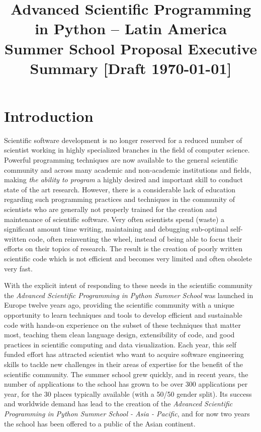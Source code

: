\documentclass{article}[11pt]
\title{%
\Large Advanced Scientific Programming in Python  -- Latin America
\\ \vspace{0.2cm}
\large Summer School Proposal  Executive Summary  [Draft \today]}
\date{}
\author{}
\begin{document}
\maketitle


\vspace*{-1.2cm}
\section*{Introduction}
Scientific software development is no longer reserved for a reduced number of
scientist working in highly specialized branches in the field of computer
science. Powerful programming techniques are now available to the general
scientific community and across many academic and non-academic institutions and
fields, making \emph{the ability to program} a highly desired and important
skill to conduct state of the art research. However, there is a considerable
lack of education regarding such programming practices and techniques in
the community of scientists who are generally not properly trained for the
creation and maintenance of scientific software. Very often scientists spend
(waste) a significant amount time writing, maintaining and debugging
sub-optimal self-written code, often reinventing the wheel, instead of being
able to focus their efforts on their topics of research. The result is the
creation of poorly written scientific code which is not efficient and becomes
very limited and often obsolete very fast.

With the explicit intent of responding to these needs in the scientific
community the \emph{Advanced Scientific Programming in Python Summer School}
was launched in Europe twelve years ago, providing the scientific community
with a unique opportunity to learn techniques and tools to develop efficient
and sustainable code with hands-on experience on the subset of these techniques
that matter most, teaching them clean language design, extensibility of code,
and good practices in scientific computing and data visualization. Each year,
this self funded effort has attracted scientist who want to acquire software
engineering skills to tackle new challenges in their areas of expertise for
the  benefit of the scientific community. The summer school grew quickly, and
in recent years, the number of applications  to the school has grown to be over
300 applications per year, for the 30 places typically available (with a 50/50
gender split). Its success and worldwide demand has lead to the creation of the
\emph{Advanced Scientific Programming in Python Summer School - Asia -
Pacific}, and for now two years the school has been offered to a public of the
Asian continent.
\end{document}

